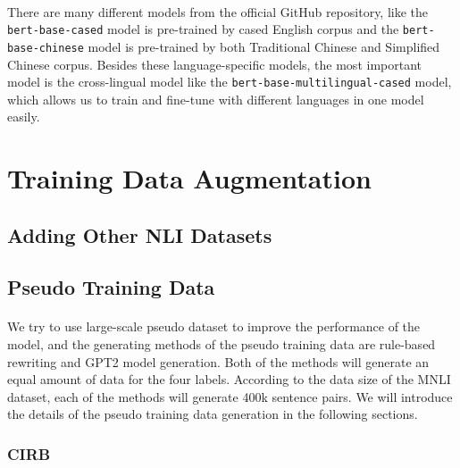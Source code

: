 \documentclass[12pt]{article}
\begin{document}
\begin{CJK*}{UTF8}{bkai}
\begin{spacing}{1.77}
\paragraph{}
There are many different models from the official GitHub repository, like the \texttt{bert-base-cased} model is pre-trained by cased English corpus and the \texttt{bert-base-chinese} model is pre-trained by both Traditional Chinese and Simplified Chinese corpus. Besides these language-specific models, the most important model is the cross-lingual model like the \texttt{bert-base-multilingual-cased} model, which allows us to train and fine-tune with different languages in one model easily.

\section{Training Data Augmentation} \label{section:pseudo}
\subsection{Adding Other NLI Datasets}

\subsection{Pseudo Training Data}
\paragraph{}
We try to use large-scale pseudo dataset to improve the performance of the model, and the generating methods of the pseudo training data are rule-based rewriting and GPT2 model generation. Both of the methods will generate an equal amount of data for the four labels. According to the data size of the MNLI dataset, each of the methods will generate 400k sentence pairs. We will introduce the details of the pseudo training data generation in the following sections.


\subsubsection{CIRB}

\end{spacing}
\end{CJK*}
\end{document}

